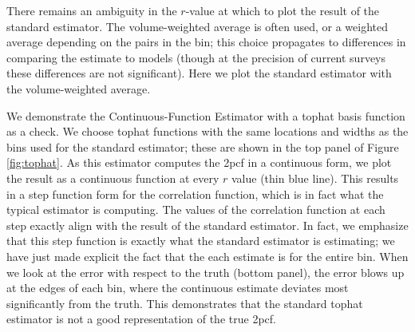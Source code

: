 \documentclass[modern]{aastex62}
\newcommand{\cf}{2pcf\xspace} %
\newcommand{\est}{the Continuous-Function Estimator\xspace}
\begin{document}
There remains an ambiguity in the $r$-value at which to plot the result of the standard estimator. 
The volume-weighted average is often used, or a weighted average depending on the pairs in the bin; this choice propagates to differences in comparing the estimate to models (though at the precision of current surveys these differences are not significant).
Here we plot the standard estimator with the volume-weighted average.

We demonstrate \est with a tophat basis function as a check.
We choose tophat functions with the same locations and widths as the bins used for the standard estimator; these are shown in the top panel of Figure \ref{fig:tophat}. 
As this estimator computes the \cf in a continuous form, we plot the result as a continuous function at every $r$ value (thin blue line).
This results in a step function form for the correlation function, which is in fact what the typical estimator is computing.
The values of the correlation function at each step exactly align with the result of the standard estimator.
In fact, we emphasize that this step function is exactly what the standard estimator is estimating; we have just made explicit the fact that the each estimate is for the entire bin.
When we look at the error with respect to the truth (bottom panel), the error blows up at the edges of each bin, where the continuous estimate deviates most significantly from the truth.
This demonstrates that the standard tophat estimator is not a good representation of the true \cf.
\end{document}
